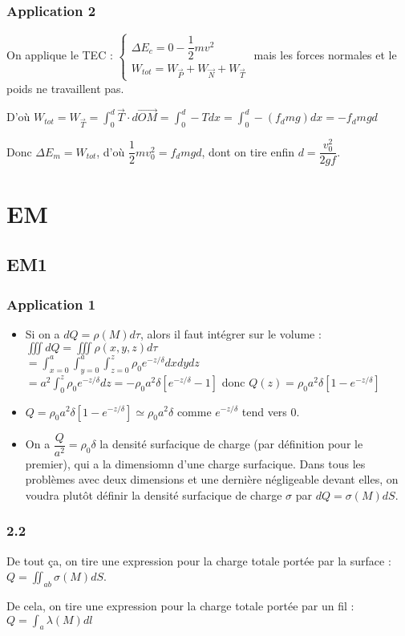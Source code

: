 \documentclass[a4paper,12pt]{book}
\begin{document}
\subsection{Application 2}
On applique le TEC : $\left\{\begin{array}{l} \Delta E_c = 0 - \dfrac{1}{2}mv^2 \\ W_{tot} = W_{\vec{P}} + W_{\vec{N}} + W_{\vec{T}}\end{array}\right.$ mais les forces normales et le poids ne travaillent pas.
\par D'où $W_{tot} = W_{\vec{T}} = \int_0^d \vec{T}\cdot d\vec{OM} = \int_0^d-Tdx = \int_0^d -(f_dmg)dx  = -f_dmgd$
\par Donc $\Delta E_m = W_{tot}$, d'où $\dfrac{1}{2}mv_0^2 = f_dmgd$, dont on tire enfin  $d = \dfrac{v_0^2}{2gf}$.


\chapter{EM}
\section{EM1}
\subsection{Application 1}
\begin{itemize}
\item Si on a $dQ= \rho(M)d\tau$, alors il faut intégrer sur le volume : $\iiint dQ =\iiint \rho(x,y,z)d\tau$
\\$ = \int_{x=0}^a\int_{y=0}^a\int_{z=0}^z \rho_0e^{-z/\delta}dxdydz$
\\ $ = a^2\int_0^z\rho_0e^{-z/\delta}dz = -\rho_0a^2\delta\left[e^{-z/\delta}-1\right]$ donc $Q(z) = \rho_0a^2\delta\left[1-e^{-z/\delta}\right]$
\item $Q = \rho_0a^2\delta\left[1-e^{-z/\delta}\right] \simeq \rho_0a^2\delta$ comme $e^{-z/\delta}$ tend vers 0.
\item On a $\dfrac{Q}{a^2} = \rho_0\delta$ la densité surfacique de charge (par définition pour le premier), qui a la dimensiomn d'une charge surfacique. Dans tous les problèmes avec deux dimensions et une dernière négligeable devant elles, on voudra plutôt définir la densité surfacique de charge $\sigma$ par $dQ=\sigma(M)dS$. 
\end{itemize}

\subsection{2.2}
De tout ça, on tire une expression pour la charge totale portée par la surface : $Q = \iint_{a b}\sigma(M)dS$.
\par De cela, on tire une expression pour la charge totale portée par un fil : $Q=\int_a\lambda(M)dl$
\end{document}
